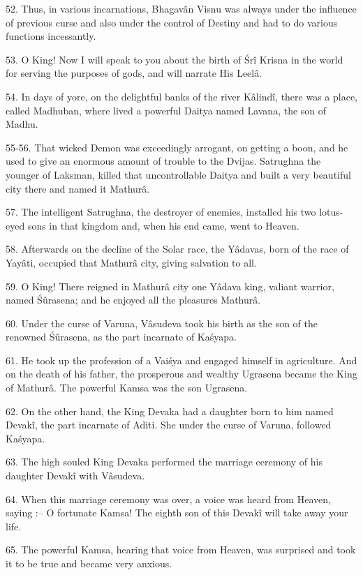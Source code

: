 52. Thus, in various incarnations, Bhagav\^an Visnu was always under the influence of previous curse and also under the control of Destiny and had to do various functions incessantly.

53. O King! Now I will speak to you about the birth of \'Sr\^i Krisna in the world for serving the purposes of gods, and will narrate His Leel\^a.

54. In days of yore, on the delightful banks of the river K\^alind\^i, there was a place, called Madhuban, where lived a powerful Daitya named Lavana, the son of Madhu.

55-56. That wicked Demon was exceedingly arrogant, on getting a boon, and he used to give an enormous amount of trouble to the Dvijas. Satrughna the younger of Laksman, killed that uncontrollable Daitya and built a very beautiful city there and named it Mathur\^a.

57. The intelligent Satrughna, the destroyer of enemies, installed his two lotus-eyed sons in that kingdom and, when his end came, went to Heaven.

58. Afterwards on the decline of the Solar race, the Y\^adavas, born of the race of Yay\^ati, occupied that Mathur\^a city, giving salvation to all.

59. O King! There reigned in Mathur\^a city one Y\^adava king, valiant warrior, named \'Sûrasena; and he enjoyed all the pleasures Mathur\^a.

60. Under the curse of Varuna, V\^asudeva took his birth as the son of the renowned \'Sûrasena, as the part incarnate of Ka\'syapa.

61. He took up the profession of a Vai\'sya and engaged himself in agriculture. And on the death of his father, the prosperous and wealthy Ugrasena became the King of Mathur\^a. The powerful Kamsa was the son Ugrasena.

62. On the other hand, the King Devaka had a daughter born to him named Devak\^i, the part incarnate of Aditi. She under the curse of Varuna, followed Ka\'syapa.

63. The high souled King Devaka performed the marriage ceremony of his daughter Devak\^i with V\^asudeva.

64. When this marriage ceremony was over, a voice was heard from Heaven, saying :-- O fortunate Kamsa! The eighth son of this Devak\^i will take away your life.

65. The powerful Kamsa, hearing that voice from Heaven, was surprised and took it to be true and became very anxious.


